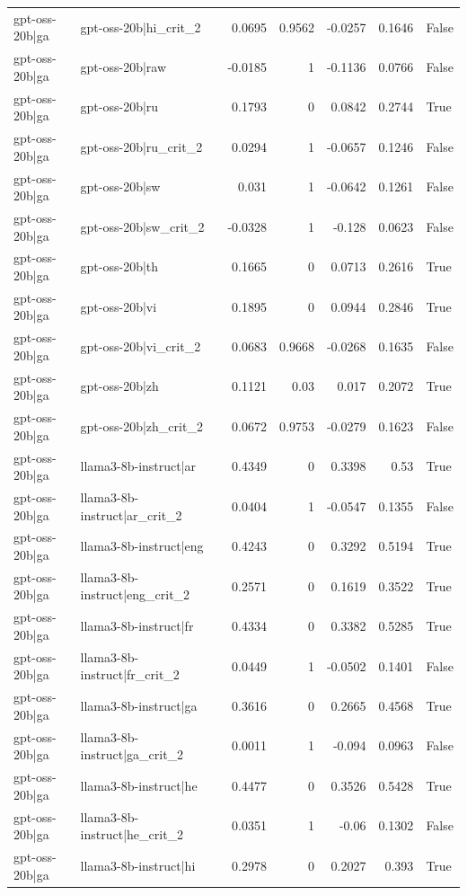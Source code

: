 \begin{table}
\begin{tabular}{l l r r r r l}
gpt-oss-20b|ga & gpt-oss-20b|hi_crit_2 & 0.0695 & 0.9562 & -0.0257 & 0.1646 & False \\
gpt-oss-20b|ga & gpt-oss-20b|raw & -0.0185 & 1 & -0.1136 & 0.0766 & False \\
gpt-oss-20b|ga & gpt-oss-20b|ru & 0.1793 & 0 & 0.0842 & 0.2744 & True \\
gpt-oss-20b|ga & gpt-oss-20b|ru_crit_2 & 0.0294 & 1 & -0.0657 & 0.1246 & False \\
gpt-oss-20b|ga & gpt-oss-20b|sw & 0.031 & 1 & -0.0642 & 0.1261 & False \\
gpt-oss-20b|ga & gpt-oss-20b|sw_crit_2 & -0.0328 & 1 & -0.128 & 0.0623 & False \\
gpt-oss-20b|ga & gpt-oss-20b|th & 0.1665 & 0 & 0.0713 & 0.2616 & True \\
gpt-oss-20b|ga & gpt-oss-20b|vi & 0.1895 & 0 & 0.0944 & 0.2846 & True \\
gpt-oss-20b|ga & gpt-oss-20b|vi_crit_2 & 0.0683 & 0.9668 & -0.0268 & 0.1635 & False \\
gpt-oss-20b|ga & gpt-oss-20b|zh & 0.1121 & 0.03 & 0.017 & 0.2072 & True \\
gpt-oss-20b|ga & gpt-oss-20b|zh_crit_2 & 0.0672 & 0.9753 & -0.0279 & 0.1623 & False \\
gpt-oss-20b|ga & llama3-8b-instruct|ar & 0.4349 & 0 & 0.3398 & 0.53 & True \\
gpt-oss-20b|ga & llama3-8b-instruct|ar_crit_2 & 0.0404 & 1 & -0.0547 & 0.1355 & False \\
gpt-oss-20b|ga & llama3-8b-instruct|eng & 0.4243 & 0 & 0.3292 & 0.5194 & True \\
gpt-oss-20b|ga & llama3-8b-instruct|eng_crit_2 & 0.2571 & 0 & 0.1619 & 0.3522 & True \\
gpt-oss-20b|ga & llama3-8b-instruct|fr & 0.4334 & 0 & 0.3382 & 0.5285 & True \\
gpt-oss-20b|ga & llama3-8b-instruct|fr_crit_2 & 0.0449 & 1 & -0.0502 & 0.1401 & False \\
gpt-oss-20b|ga & llama3-8b-instruct|ga & 0.3616 & 0 & 0.2665 & 0.4568 & True \\
gpt-oss-20b|ga & llama3-8b-instruct|ga_crit_2 & 0.0011 & 1 & -0.094 & 0.0963 & False \\
gpt-oss-20b|ga & llama3-8b-instruct|he & 0.4477 & 0 & 0.3526 & 0.5428 & True \\
gpt-oss-20b|ga & llama3-8b-instruct|he_crit_2 & 0.0351 & 1 & -0.06 & 0.1302 & False \\
gpt-oss-20b|ga & llama3-8b-instruct|hi & 0.2978 & 0 & 0.2027 & 0.393 & True \\

\end{tabular}
\end{table}
